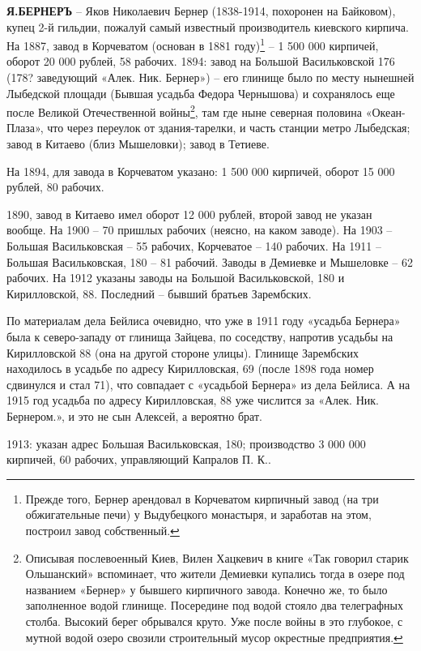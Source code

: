 \noindent\textbf{Я.БЕРНЕРЪ} – Яков Николаевич Бернер (1838-1914, похоронен на Байковом), купец 2-й гильдии, пожалуй самый известный производитель киевского кирпича. На 1887, завод в Корчеватом (основан в 1881 году)\footnote{Прежде того, Бернер арендовал в Корчеватом кирпичный завод (на три обжигательные печи) у Выдубецкого монастыря, и заработав на этом, построил завод собственный.} – 1 500 000 кирпичей, оборот 20 000 рублей, 58 рабочих. 1894: завод на Большой Васильковской 176 (178? заведующий «Алек. Ник. Бернер») – его глинище было по месту нынешней Лыбедской площади (Бывшая усадьба Федора Чернышова) и сохранялось еще после Великой Отечественной войны\footnote{Описывая послевоенный Киев, Вилен Хацкевич в книге «Так говорил старик Ольшанский» вспоминает, что жители Демиевки купались тогда в озере под названием «Бернер» у бывшего кирпичного завода. Конечно же, то было заполненное водой глинище. Посередине под водой стояло два телеграфных столба. Высокий берег обрывался круто. Уже после войны в это глубокое, с мутной водой озеро свозили строительный мусор окрестные предприятия.}, там где ныне северная половина «Океан-Плаза», что через переулок от здания-тарелки, и часть станции метро Лыбедская; завод в Китаево (близ Мышеловки); завод в Тетиеве.

На 1894, для завода в Корчеватом указано: 1 500 000 кирпичей, оборот 15 000 рублей, 80 рабочих.

1890, завод в Китаево имел оборот 12 000 рублей, второй завод не указан вообще. На 1900 – 70 пришлых рабочих (неясно, на каком заводе). На 1903 – Большая Васильковская – 55 рабочих, Корчеватое – 140 рабочих. На 1911 – Большая Васильковская, 180 – 81 рабочий. Заводы в Демиевке и Мышеловке – 62 рабочих. На 1912 указаны заводы на Большой Васильковской, 180 и Кирилловской, 88. Последний – бывший братьев Зарембских. 

По материалам дела Бейлиса\cite{beylisdelo} очевидно, что уже в 1911 году «усадьба Бернера» была к северо-западу от глинища Зайцева, по соседству, напротив усадьбы на Кирилловской 88 (она на другой стороне улицы). Глинище Зарембских находилось в усадьбе по адресу Кирилловская, 69 (после 1898 года номер сдвинулся и стал 71), что совпадает с «усадьбой Бернера» из дела Бейлиса. А на 1915 год усадьба по адресу Кирилловская, 88 уже числится за «Алек. Ник. Бернером.», и это не сын Алексей, а вероятно брат.

1913: указан адрес Большая Васильковская, 180; производство 3 000 000 кирпичей, 60 рабочих, управляющий Капралов П. К..

